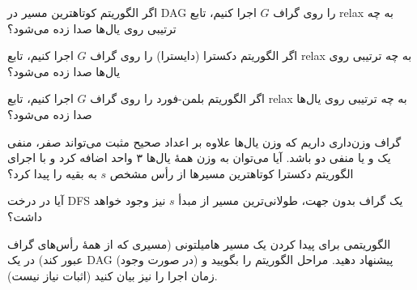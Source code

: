 \documentclass[12pt, a4paper]{article}
\newcommand{\vsp}{\vspace{34pt}}
\newcommand{\پاسخ}[2]{#1}
\begin{document}
اگر الگوریتم کوتاهترین مسیر در DAG را روی گراف $G$ اجرا کنیم، تابع relax به چه ترتیبی روی یال‌ها صدا زده می‌شود؟

\پاسخ{\vsp\vsp}{
ترتیب یال‌ها در زیر آمده است. توجه کنید یال‌هایی که در $\{\}$ قرار گرفتند، ترتیب‌شان نسبت هم مهم نیست.
\begin{center}
$\{(s,a),(s,b)\},\{(a,b),(a,c)\},(b,c)$
\end{center}

}

اگر الگوریتم دکسترا (دایسترا) را روی گراف $G$ اجرا کنیم، تابع relax به چه ترتیبی روی یال‌ها صدا زده می‌شود؟


\پاسخ{\vsp\vsp}{
\begin{center}
$\{(s,a),(s,b)\},(b,c),\{(a,b),(a,c)\}$
\end{center}

}

اگر الگوریتم بلمن-فورد را روی گراف $G$ اجرا کنیم، تابع relax به چه ترتیبی روی یال‌ها صدا زده می‌شود؟

\پاسخ{\vsp\vsp}{
\begin{center}
$\{(s, a), (s,b), (b,c), (a,b), (a,c)\},$\\
$\{(s, a), (s,b), (b,c), (a,b), (a,c)\},$\\
$\{(s, a), (s,b), (b,c), (a,b), (a,c)\}$
\end{center}

}
	
گراف وزن‌داری داریم که وزن یال‌ها علاوه بر اعداد صحیح مثبت می‌تواند صفر، منفی یک و یا منفی دو باشد. آیا می‌توان به وزن همۀ یال‌ها ۳ واحد اضافه کرد و با اجرای الگوریتم دکسترا کوتاهترین مسیرها از رأس مشخص $s$ به بقیه را پیدا کرد؟

\پاسخ{\vsp\vsp}{
	خیر. گراف سه رأسی مسیر $P_3$ و رأس $t$ را به عنوان یک مقصد در نظر بگیرید. اگر برای وزن یال‌ها داشته باشیم $w(s,t)=-1$، $w(s,v)=0$ و $w(v,t)=-2$، در این صورت مسیر به درستی پیدا نمی‌شود.
	
}

آیا در درخت DFS یک گراف بدون جهت، طولانی‌ترین مسیر از مبدأ $s$ نیز وجود خواهد داشت؟

\پاسخ{\vsp\vsp}{
خیر. مثال نقض به سادگی پیدا می‌شود. توجه کنید DFS ممکن است همسایه‌ها را به ترتیب بدی پیمایش کند.
	
}

الگوریتمی برای پیدا کردن یک مسیر هامیلتونی (مسیری که از همۀ رأس‌های گراف عبور کند) در یک DAG (در صورت وجود) پیشنهاد دهید. مراحل الگوریتم را بگویید و زمان اجرا را نیز بیان کنید (اثبات نیاز نیست).
\end{document}
